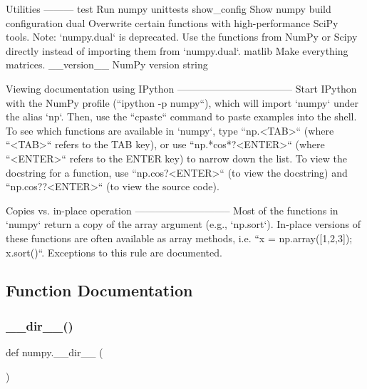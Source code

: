 \begin{DoxyVerb}
Utilities
---------
test
Run numpy unittests
show_config
Show numpy build configuration
dual
Overwrite certain functions with high-performance SciPy tools.
Note: `numpy.dual` is deprecated.  Use the functions from NumPy or Scipy
directly instead of importing them from `numpy.dual`.
matlib
Make everything matrices.
__version__
NumPy version string

Viewing documentation using IPython
-----------------------------------
Start IPython with the NumPy profile (``ipython -p numpy``), which will
import `numpy` under the alias `np`.  Then, use the ``cpaste`` command to
paste examples into the shell.  To see which functions are available in
`numpy`, type ``np.<TAB>`` (where ``<TAB>`` refers to the TAB key), or use
``np.*cos*?<ENTER>`` (where ``<ENTER>`` refers to the ENTER key) to narrow
down the list.  To view the docstring for a function, use
``np.cos?<ENTER>`` (to view the docstring) and ``np.cos??<ENTER>`` (to view
the source code).

Copies vs. in-place operation
-----------------------------
Most of the functions in `numpy` return a copy of the array argument
(e.g., `np.sort`).  In-place versions of these functions are often
available as array methods, i.e. ``x = np.array([1,2,3]); x.sort()``.
Exceptions to this rule are documented.\end{DoxyVerb}
 

\subsection{Function Documentation}
\mbox{\label{namespacenumpy_a05ae198afa113ce10c617885c28b79fa}} 
\subsubsection{\texorpdfstring{\+\_\+\+\_\+dir\+\_\+\+\_\+()}{\_\_dir\_\_()}}
{\footnotesize\ttfamily def numpy.\+\_\+\+\_\+dir\+\_\+\+\_\+ (\begin{DoxyParamCaption}{ }\end{DoxyParamCaption})}

\mbox{\label{namespacenumpy_a769fc49989b89b83a8a22d1fc5957707}} 
